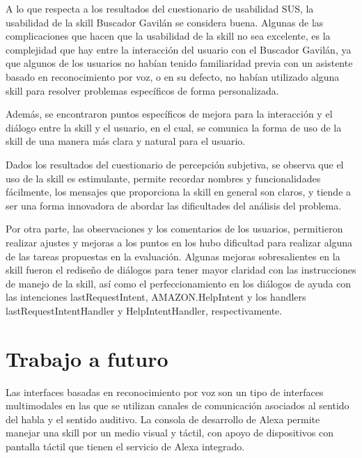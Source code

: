 A lo que respecta a los resultados del cuestionario de usabilidad SUS, la usabilidad de la skill Buscador Gavilán se considera buena. Algunas de las complicaciones que hacen que la usabilidad de la skill no sea excelente, es la complejidad que hay entre la interacción del usuario con el Buscador Gavilán, ya que algunos de los usuarios no habían tenido familiaridad previa con un asistente basado en reconocimiento por voz, o en su defecto, no habían utilizado alguna skill para resolver problemas específicos de forma personalizada.

Además, se encontraron puntos específicos de mejora para la interacción y el diálogo entre la skill y el usuario, en el cual, se comunica la forma de uso de la skill de una manera más clara y natural para el usuario.

Dados los resultados del cuestionario de percepción subjetiva, se observa que el uso de la skill es estimulante, permite recordar nombres y funcionalidades fácilmente, los mensajes que proporciona la skill en general son claros, y tiende a ser una forma innovadora de abordar las dificultades del análisis del problema.

Por otra parte, las observaciones y los comentarios de los usuarios, permitieron realizar ajustes y mejoras a los puntos en los hubo dificultad para realizar alguna de las tareas propuestas en la evaluación. Algunas mejoras sobresalientes en la skill fueron el rediseño de diálogos para tener mayor claridad con las instrucciones de manejo de la skill, así como el perfeccionamiento en los diálogos de ayuda con las intenciones lastRequestIntent, AMAZON.HelpIntent y los handlers lastRequestIntentHandler y HelpIntentHandler, respectivamente.


\section{Trabajo a futuro}
\label{TrabajoFuturocapV}

Las interfaces basadas en reconocimiento por voz son un tipo de interfaces multimodales en las que se utilizan canales de comunicación asociados al sentido del habla y el sentido auditivo. La consola de desarrollo de Alexa permite manejar una skill por un medio visual y táctil, con apoyo de dispositivos con pantalla táctil que tienen el servicio de Alexa integrado.

